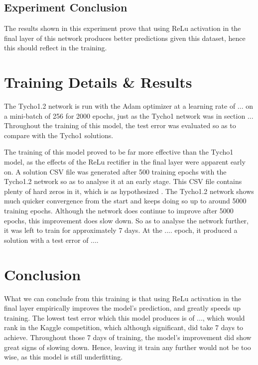 \documentclass[12pt,a4paper,oneside,oldfontcommands]{memoir}
\begin{document}
\subsection{Experiment Conclusion}

The results shown in this experiment prove that using ReLu activation in the final layer of this network produces better predictions given this dataset, hence this should reflect in the training. 

\section{Training Details & Results}

The Tycho1.2 network is run with the Adam optimizer at a learning rate of ... on a mini-batch of 256 for 2000 epochs, just as the Tycho1 network was in section ... Throughout the training of this model, the test error was evaluated so as to compare with the Tycho1 solutions. 

The training of this model proved to be far more effective than the Tycho1 model, as the effects of the ReLu rectifier in the final layer were apparent early on. A solution CSV file was generated after 500 training epochs with the Tycho1.2 network so as to analyse it at an early stage. This CSV file contains plenty of hard zeros in it, which is as hypothesized . The Tycho1.2 network shows much quicker convergence from the start and keeps doing so up to around 5000 training epochs. Although the network does continue to improve after 5000 epochs, this improvement does slow down. So as to analyse the network further, it was left to train for approximately 7 days. At the .... epoch, it produced a solution with a test error of .... 

\section{Conclusion}

What we can conclude from this training is that using ReLu activation in the final layer empirically improves the model's prediction, and greatly speeds up training. The lowest test error which this model produces is of ..., which would rank  in the Kaggle competition, which although significant, did take 7 days to achieve. Throughout those 7 days of training, the model's improvement did show great signs of slowing down. Hence, leaving it train any further would not be too wise, as this model is still underfitting. 
\end{document}
